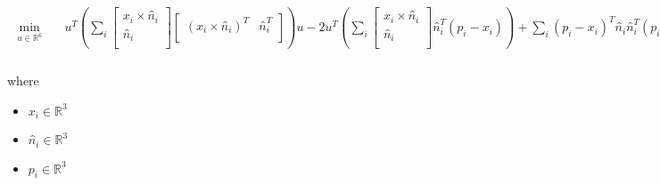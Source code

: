 \documentclass[12pt]{article}
\begin{document}
\begin{align*}
\begin{aligned} \min_{\textit{u} \in \mathbb{R}^{ 6}} \quad & \textit{u}^T\left( \sum_\textit{i} \begin{bmatrix}
\textit{x}_{ \textit{i} } × \textit{n̂}_{ \textit{i} }\\
\textit{n̂}_{ \textit{i} }\\
\end{bmatrix}\begin{bmatrix}
\left( \textit{x}_{ \textit{i} } × \textit{n̂}_{ \textit{i} } \right)^T & \textit{n̂}_{ \textit{i} }^T\\
\end{bmatrix} \right)\textit{u} - 2\textit{u}^T\left( \sum_\textit{i} \begin{bmatrix}
\textit{x}_{ \textit{i} } × \textit{n̂}_{ \textit{i} }\\
\textit{n̂}_{ \textit{i} }\\
\end{bmatrix}\textit{n̂}_{ \textit{i} }^T\left( \textit{p}_{ \textit{i} } - \textit{x}_{ \textit{i} } \right) \right) + \sum_\textit{i} \left( \textit{p}_{ \textit{i} } - \textit{x}_{ \textit{i} } \right)^T\textit{n̂}_{ \textit{i} }\textit{n̂}_{ \textit{i} }^T\left( \textit{p}_{ \textit{i} } - \textit{x}_{ \textit{i} } \right) \\
\end{aligned}
\end{align*}

where
\begin{itemize}
\item $\textit{x}_{\textit{i}} \in \mathbb{R}^{ 3}$
\item $\textit{n̂}_{\textit{i}} \in \mathbb{R}^{ 3}$
\item $\textit{p}_{\textit{i}} \in \mathbb{R}^{ 3}$
\end{itemize}
\end{document}
